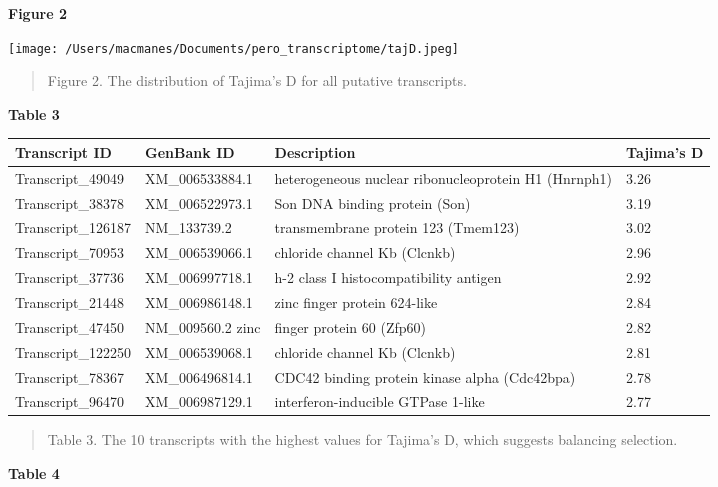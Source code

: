\documentclass[12pt]{article}
\begin{document}
\textbf{\hypertarget{Figure 2}{Figure 2}} \\
\centerline{\texttt{[image: /Users/macmanes/Documents/pero\_transcriptome/tajD.jpeg]}}
\begin{quote}
\small{Figure 2. The distribution of Tajima's D for all putative transcripts.}
\end{quote}  
\vspace{10mm}
\textbf{\hypertarget{Table 3}{Table 3}} \\
\begin{center}
\begin{adjustwidth}{-.75in}{-.75in}%
\begin{tabular}{ l l l l }
\textbf{Transcript ID} & \textbf{GenBank ID} & \textbf{Description} & \textbf{Tajima's D}\\
\hline
Transcript\_49049 & XM\_006533884.1 & heterogeneous nuclear ribonucleoprotein H1 (Hnrnph1) & 3.26\\
Transcript\_38378 & XM\_006522973.1 & Son DNA binding protein (Son) & 3.19\\
Transcript\_126187 & NM\_133739.2 & transmembrane protein 123 (Tmem123) & 3.02\\
Transcript\_70953 & XM\_006539066.1 & chloride channel Kb (Clcnkb) & 2.96 \\
Transcript\_37736 & XM\_006997718.1 & h-2 class I histocompatibility antigen & 2.92 \\
Transcript\_21448 & XM\_006986148.1 & zinc finger protein 624-like & 2.84\\
Transcript\_47450 & NM\_009560.2 zinc & finger protein 60 (Zfp60) & 2.82\\
Transcript\_122250 & XM\_006539068.1 & chloride channel Kb (Clcnkb) & 2.81\\
Transcript\_78367 & XM\_006496814.1 & CDC42 binding protein kinase alpha (Cdc42bpa) & 2.78 \\
Transcript\_96470 & XM\_006987129.1 & interferon-inducible GTPase 1-like & 2.77 \\
 \end{tabular}
\begin{quote}
\small{Table 3. The 10 transcripts with the highest values for Tajima's D, which suggests balancing selection.}
\end{quote}  
\end{adjustwidth}
\end{center}
\vspace{10mm}
\textbf{\hypertarget{Table 4}{Table 4}} \\
\end{document}
